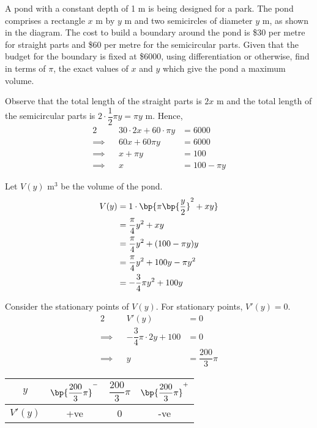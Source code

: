 \documentclass{echw}
\begin{document}
         A pond with a constant depth of 1 m is being designed for a park. The pond comprises a rectangle $x$ m by $y$ m and two semicircles of diameter $y$ m, as shown in the diagram. The cost to build a boundary around the pond is \$30 per metre for straight parts and \$60 per metre for the semicircular parts. Given that the budget for the boundary is fixed at \$6000, using differentiation or otherwise, find in terms of $\pi$, the exact values of $x$ and $y$ which give the pond a maximum volume.

    \solution
        Observe that the total length of the straight parts is $2x$ m and the total length of the semicircular parts is $2 \cdot \dfrac12 \pi y = \pi y$ m. Hence,
        \begin{alignat*}{2}
            &&30 \cdot 2x + 60 \cdot \pi y &= 6000\\
            \implies&&60x + 60 \pi y &= 6000\\
            \implies&&x + \pi y &= 100\\
            \implies&&x &= 100 - \pi y
        \end{alignat*}

        Let $V(y)$ m$^3$ be the volume of the pond.
        \begin{align*}
            V(y) &= 1 \cdot \bp{\pi \bp{\dfrac{y}2}^2 + xy}\\
            &= \dfrac{\pi}4 y^2 + xy\\
            &= \dfrac{\pi}4 y^2 + (100 - \pi y )y\\
            &= \dfrac{\pi}4 y^2 + 100y - \pi y^2\\
            &= - \dfrac{3}4 \pi y^2 + 100y
        \end{align*}

        Consider the stationary points of $V(y)$. For stationary points, $V'(y) = 0$.
        \begin{alignat*}{2}
            &&V'(y) &= 0\\
            \implies&&-\dfrac34 \pi \cdot 2y + 100 &= 0\\
            \implies&& y &= \dfrac{200}3 \pi
        \end{alignat*}

        \begin{table}[h]
            \centering
            \begin{tabular}{|c|c|c|c|}
            \hline
            $y$ & $\bp{\dfrac{200}3 \pi}^-$ & $\dfrac{200}3 \pi$ & $\bp{\dfrac{200}3 \pi}^+$ \\\hline
            $V'(y)$ & +ve   & 0 & -ve   \\[1ex]\hline
            \end{tabular}
        \end{table}
\end{document}
